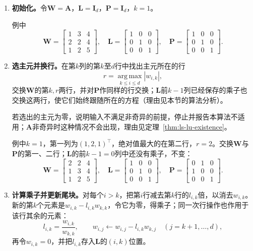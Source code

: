 \begin{enumerate}
 \item \textbf{初始化。}令$\bm W=\bm A$，$\bm L=\bm I_d$，$\bm P=\bm I_d$，$k=1$。

 例中
 \[
  \bm W=\begin{bmatrix}1&3&4\\2&2&4\\1&2&5\end{bmatrix},\quad
  \bm L=\begin{bmatrix}1&0&0\\0&1&0\\0&0&1\end{bmatrix},\quad
  \bm P=\begin{bmatrix}1&0&0\\0&1&0\\0&0&1\end{bmatrix}.
 \]

 \item \textbf{选主元并换行。}在第$k$列的第$k$至$d$行中找出主元所在的行
 \begin{equation}
  r=\operatorname*{arg\,max}_{k\leq i\leq d}|w_{i,k}| ,
  \label{eq:ls-lu-partial-pivot}
 \end{equation}
 交换$\bm W$的第$k,r$两行，并对$\bm P$作同样的行交换；$\bm L$前$k-1$列已经保存的乘子也交换这两行，使它们始终跟随所在的方程（理由见本节的算法分析）。
 
 若选出的主元为零，说明输入不满足非奇异的前提，停止并报告本算法不适用；$\bm A$非奇异时这种情况不会出现，理由见定理~\ref{thm:ls-lu-existence}。

 例中$k=1$，第一列为$(1,2,1)^\top$，绝对值最大的在第二行，$r=2$。交换$\bm W$与$\bm P$的第一、二行；$\bm L$的前$k-1=0$列中还没有乘子，不变：
 \[
  \bm W=\begin{bmatrix}2&2&4\\1&3&4\\1&2&5\end{bmatrix},\quad
  \bm L=\begin{bmatrix}1&0&0\\0&1&0\\0&0&1\end{bmatrix},\quad
  \bm P=\begin{bmatrix}0&1&0\\1&0&0\\0&0&1\end{bmatrix}.
 \]

 \item \textbf{计算乘子并更新尾块。}对每个$i>k$，把第$i$行减去第$k$行的$l_{i,k}$倍，以消去$w_{i,k}$。新的第$k$个元素是$w_{i,k}-l_{i,k}w_{k,k}$，令它为零，得乘子；同一次行操作也作用于该行其余的元素：
 \begin{equation}
  l_{i,k}=\frac{w_{i,k}}{w_{k,k}},\qquad
  w_{i,j}\leftarrow w_{i,j}-l_{i,k}w_{k,j}\quad(j=k+1,\ldots,d),
  \label{eq:ls-lu-elimination-update}
 \end{equation}
 再令$w_{i,k}=0$，并把$l_{i,k}$存入$\bm L$的$(i,k)$位置。
 

\end{enumerate}
